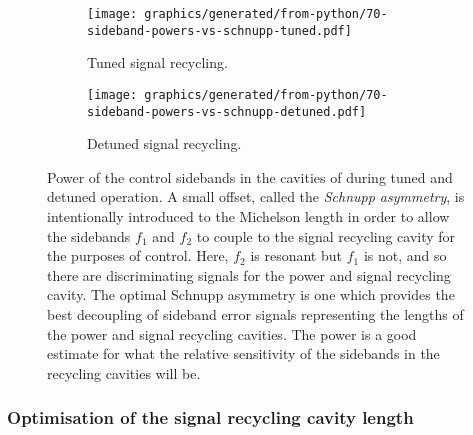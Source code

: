 \begin{figure}
  \centering
  \begin{subfigure}{.49\textwidth}
    \texttt{[image: graphics/generated/from-python/70-sideband-powers-vs-schnupp-tuned.pdf]}
    \caption[Power of the control sidebands in the cavities of \ETLF{} with tuned signal recycling]{\label{fig:sideband-powers-vs-schnupp-tuned}Tuned signal recycling.}
  \end{subfigure}
  \hfill
  \begin{subfigure}{.49\textwidth}
    \texttt{[image: graphics/generated/from-python/70-sideband-powers-vs-schnupp-detuned.pdf]}
    \caption[Power of the control sidebands in the cavities of \ETLF{} with tuned signal recycling]{\label{fig:sideband-powers-vs-schnupp-detuned}Detuned signal recycling.}
  \end{subfigure}
  \caption[Power of the control sidebands in the cavities of \ETLF{}]{\label{fig:sideband-powers-vs-schnupp}Power of the control sidebands in the cavities of \ETLF{} during tuned and detuned operation. A small offset, called the \emph{Schnupp asymmetry}, is intentionally introduced to the Michelson length in order to allow the sidebands $f_1$ and $f_2$ to couple to the signal recycling cavity for the purposes of control. Here, $f_2$ is resonant but $f_1$ is not, and so there are discriminating signals for the power and signal recycling cavity. The optimal Schnupp asymmetry is one which provides the best decoupling of sideband error signals representing the lengths of the power and signal recycling cavities. The power is a good estimate for what the relative sensitivity of the sidebands in the recycling cavities will be.}
\end{figure}

\subsubsection{Optimisation of the signal recycling cavity length}

